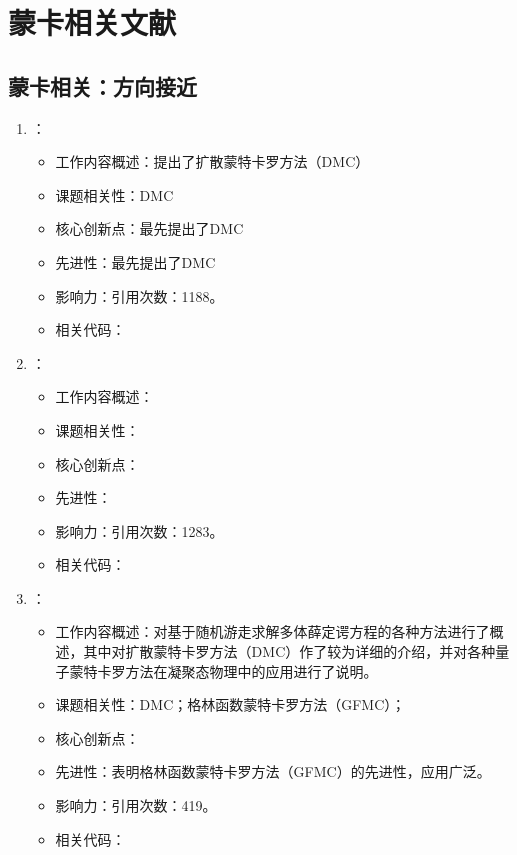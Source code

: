 \chapter{蒙卡相关文献}
\section{蒙卡相关：方向接近}
    \begin{enumerate}
        \item \citet{anderson1975random}：
            \begin{itemize}
                \item 工作内容概述：提出了扩散蒙特卡罗方法（DMC）
                \item 课题相关性：DMC
                \item 核心创新点：最先提出了DMC
                \item 先进性：最先提出了DMC
                \item 影响力：引用次数：1188。
                \item 相关代码：
            \end{itemize}
        \item \citet{reynolds1982fixed}：
        \begin{itemize}
            \item 工作内容概述：
            \item 课题相关性：
            \item 核心创新点：
            \item 先进性：
            \item 影响力：引用次数：1283。
            \item 相关代码：
        \end{itemize}
        \item \citet{ceperley1986quantum}：
            \begin{itemize}
                \item 工作内容概述：对基于随机游走求解多体薛定谔方程的各种方法进行了概述，其中对扩散蒙特卡罗方法（DMC）作了较为详细的介绍，并对各种量子蒙特卡罗方法在凝聚态物理中的应用进行了说明。
                \item 课题相关性：DMC；格林函数蒙特卡罗方法（GFMC）；
                \item 核心创新点：
                \item 先进性：表明格林函数蒙特卡罗方法（GFMC）的先进性，应用广泛。
                \item 影响力：引用次数：419。
                \item 相关代码：

\end{itemize}
\end{enumerate}
